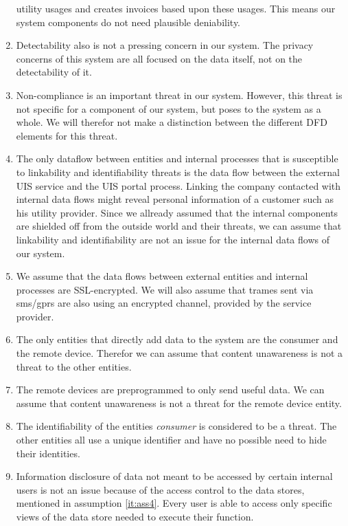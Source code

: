 \begin{enumerate}
			utility usages and creates invoices based upon these usages. This
			means our system components do not need plausible deniability.
	\item \label{it:ass6}Detectability also is not a pressing concern in our system. The privacy
			concerns of this system are all focused on the data itself, not on the
			detectability of it.
	\item \label{it:ass7}Non-compliance is an important threat in our system. However, this threat
			is not specific for a component of our system, but poses to the system
			as a whole. We will therefor not make a distinction between the different
			DFD elements for this threat.
	\item \label{it:ass8}The only dataflow between entities and internal processes that is susceptible to
			linkability and identifiability threats is the data flow between the external UIS service and
			the UIS portal process. Linking the company contacted with internal
			data flows might reveal personal information of a customer such as his
			utility provider. Since we allready assumed that the internal components are shielded off from
			the outside world and their threats, we can assume that linkability and identifiability are not an issue
			for the internal data flows of our system.
	\item \label{it:ass9}We assume that the data flows between external entities and internal processes
			are SSL-encrypted. We will also assume that trames sent via sms/gprs are
			also using an encrypted channel, provided by the service provider.
	\item \label{it:ass10}The only entities that directly add data to the system are the consumer and
			the remote device. Therefor we can assume that content unawareness is not a threat to the
			other entities.
	\item \label{it:ass11}The remote devices are preprogrammed to only send useful data. We can assume
			that content unawareness is not a threat for the remote device entity.
	\item \label{it:ass12} The identifiability of the entities \textit{consumer} is considered to be a threat. 
			The other entities all use a unique identifier and have no possible need to hide their identities. 
	\item \label{it:ass13} Information disclosure of data not meant to be accessed by certain internal users is not an issue because of the access control to the data stores, mentioned in assumption \ref{it:ass4}. 
Every user is able to access only specific views of the data store needed to execute their function.

\end{enumerate}
